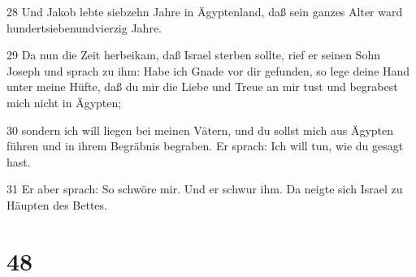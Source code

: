 \par 28 Und Jakob lebte siebzehn Jahre in Ägyptenland, daß sein ganzes Alter ward hundertsiebenundvierzig Jahre.
\par 29 Da nun die Zeit herbeikam, daß Israel sterben sollte, rief er seinen Sohn Joseph und sprach zu ihm: Habe ich Gnade vor dir gefunden, so lege deine Hand unter meine Hüfte, daß du mir die Liebe und Treue an mir tust und begrabest mich nicht in Ägypten;
\par 30 sondern ich will liegen bei meinen Vätern, und du sollst mich aus Ägypten führen und in ihrem Begräbnis begraben. Er sprach: Ich will tun, wie du gesagt hast.
\par 31 Er aber sprach: So schwöre mir. Und er schwur ihm. Da neigte sich Israel zu Häupten des Bettes.

\chapter{48}

